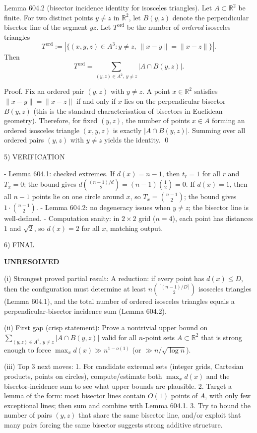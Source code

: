 Lemma 604.2 (bisector incidence identity for isosceles triangles).
Let $A\subset\mathbb R^2$ be finite.
For two distinct points $y\neq z$ in $\mathbb R^2$, let $B(y,z)$ denote the perpendicular bisector line of the segment $yz$.
Let $T^{\mathrm{ord}}$ be the number of \emph{ordered} isosceles triangles
\[
T^{\mathrm{ord}} := |\{(x,y,z)\in A^3: y\neq z,\ \|x-y\|=\|x-z\|\}|.
\]
Then
\[
T^{\mathrm{ord}} = \sum_{(y,z)\in A^2,\ y\neq z} |A\cap B(y,z)|.
\]

Proof.
Fix an ordered pair $(y,z)$ with $y\neq z$.
A point $x\in\mathbb R^2$ satisfies $\|x-y\|=\|x-z\|$ if and only if $x$ lies on the perpendicular bisector $B(y,z)$ (this is the standard characterisation of bisectors in Euclidean geometry).
Therefore, for fixed $(y,z)$, the number of points $x\in A$ forming an ordered isosceles triangle $(x,y,z)$ is exactly $|A\cap B(y,z)|$.
Summing over all ordered pairs $(y,z)$ with $y\neq z$ yields the identity.
\qed

5) VERIFICATION

- Lemma 604.1: checked extremes. If $d(x)=n-1$, then $t_r=1$ for all $r$ and $T_x=0$; the bound gives $d\binom{(n-1)/d}{2}=(n-1)\binom{1}{2}=0$.
If $d(x)=1$, then all $n-1$ points lie on one circle around $x$, so $T_x=\binom{n-1}{2}$; the bound gives $1\cdot\binom{n-1}{2}$.
- Lemma 604.2: no degeneracy issues when $y\neq z$; the bisector line is well-defined.
- Computation sanity: in $2\times 2$ grid ($n=4$), each point has distances $1$ and $\sqrt2$, so $d(x)=2$ for all $x$, matching output.

6) FINAL

\textbf{UNRESOLVED}

(i) Strongest proved partial result:
A reduction: if every point has $d(x)\le D$, then the configuration must determine at least $n\binom{\lceil (n-1)/D\rceil}{2}$ isosceles triangles (Lemma 604.1), and the total number of ordered isosceles triangles equals a perpendicular-bisector incidence sum (Lemma 604.2).

(ii) First gap (crisp statement):
Prove a nontrivial upper bound on
$\sum_{(y,z)\in A^2,\ y\neq z} |A\cap B(y,z)|$
valid for all $n$-point sets $A\subset\mathbb R^2$ that is strong enough to force $\max_x d(x)\gg n^{1-o(1)}$ (or $\gg n/\sqrt{\log n}$).

(iii) Top 3 next moves:
1. For candidate extremal sets (integer grids, Cartesian products, points on circles), compute/estimate both $\max_x d(x)$ and the bisector-incidence sum to see what upper bounds are plausible.
2. Target a lemma of the form: most bisector lines contain $O(1)$ points of $A$, with only few exceptional lines; then sum and combine with Lemma 604.1.
3. Try to bound the number of pairs $(y,z)$ that share the same bisector line, and/or exploit that many pairs forcing the same bisector suggests strong additive structure.

